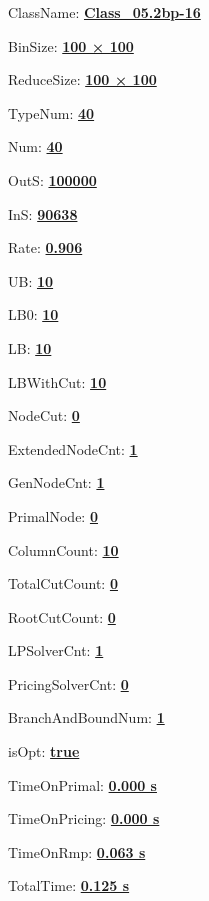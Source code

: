 \documentclass[11pt]{article}
\begin{document}
\pagestyle{empty}


ClassName: \underline{\textbf{Class_05.2bp-16}}
\par
BinSize: \underline{\textbf{100 × 100}}
\par
ReduceSize: \underline{\textbf{100 × 100}}
\par
TypeNum: \underline{\textbf{40}}
\par
Num: \underline{\textbf{40}}
\par
OutS: \underline{\textbf{100000}}
\par
InS: \underline{\textbf{90638}}
\par
Rate: \underline{\textbf{0.906}}
\par
UB: \underline{\textbf{10}}
\par
LB0: \underline{\textbf{10}}
\par
LB: \underline{\textbf{10}}
\par
LBWithCut: \underline{\textbf{10}}
\par
NodeCut: \underline{\textbf{0}}
\par
ExtendedNodeCnt: \underline{\textbf{1}}
\par
GenNodeCnt: \underline{\textbf{1}}
\par
PrimalNode: \underline{\textbf{0}}
\par
ColumnCount: \underline{\textbf{10}}
\par
TotalCutCount: \underline{\textbf{0}}
\par
RootCutCount: \underline{\textbf{0}}
\par
LPSolverCnt: \underline{\textbf{1}}
\par
PricingSolverCnt: \underline{\textbf{0}}
\par
BranchAndBoundNum: \underline{\textbf{1}}
\par
isOpt: \underline{\textbf{true}}
\par
TimeOnPrimal: \underline{\textbf{0.000 s}}
\par
TimeOnPricing: \underline{\textbf{0.000 s}}
\par
TimeOnRmp: \underline{\textbf{0.063 s}}
\par
TotalTime: \underline{\textbf{0.125 s}}
\par
\newpage


\end{document}
